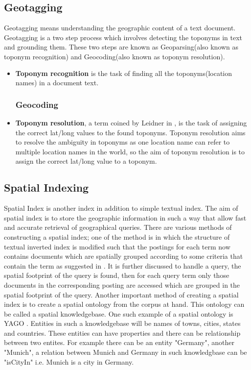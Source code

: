 \documentclass[
     11pt,         %
     a4paper,      %
     oneside,
     ]{article}
\begin{document}
\subsection{Geotagging} Geotagging means understanding the geographic content of a text document. Geotagging is a two step process which involves detecting the toponyms in text and grounding them. These two steps are known as Geoparsing(also known as toponym recognition) and Geocoding(also known as toponym resolution). 

\begin{itemize}
	\subsubsection{Geoparsing}
	\item[] \textbf{Toponym recognition} is the task of finding all the toponyms(location names) in a document text.
	\subsubsection{Geocoding}
	\item[] \textbf{Toponym resolution}, a term coined by Leidner in \cite{Leidner:2008:PhD}, is the task of assigning the correct lat/long values to the found toponyms. Toponym resolution aims to resolve the ambiguity in toponyms as one location name can refer to multiple location names in the world, so the aim of toponym resolution is to assign the correct lat/long value to a toponym.
\end{itemize}

\subsection{Spatial Indexing} Spatial Index is another index in addition to simple textual index. The aim of spatial index is to store the geographic information in such a way that allow fast and accurate retrieval of geographical queries. There are various methods of constructing a spatial index; one of the method is in which the structure of textual inverted index is modified such that the postings for each term now contains documents which are spatially grouped according to some criteria that contain the term as suggested in \cite{Vaid:2005:SIG:2156226.2156244}. It is further discussed to handle a query, the spatial footprint of the query is found, then for each query term only those documents in the corresponding posting are accessed which are grouped in the spatial footprint of the query. Another important method of creating a spatial index is to create a spatial ontology from the corpus at hand. This ontology can be called a spatial knowledgebase. One such example of a spatial ontology is YAGO \cite{yago-website}. Entities in such a knowledgebase will be names of towns, cities, states and countries. These entities can have properties and there can be relationship between two entites. For example there can be an entity "Germany", another "Munich", a relation between Munich and Germany in such knowledgbase can be "isCityIn" i.e. Munich is a city in Germany.
\end{document}
